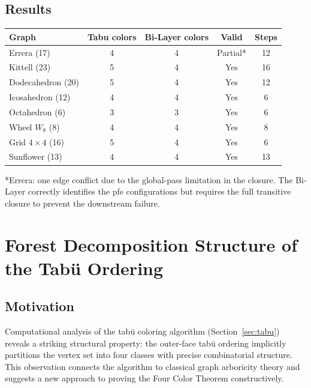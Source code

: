 \documentclass[12pt,letterpaper]{article}
\theoremstyle{plain}
\theoremstyle{definition}
\theoremstyle{remark}
\begin{document}
\subsection{Results}

\begin{center}
\begin{tabular}{lcccc}
\toprule
\textbf{Graph} & \textbf{Tabu colors} & \textbf{Bi-Layer colors} & \textbf{Valid} & \textbf{Steps} \\
\midrule
Errera (17)       & 4 & 4 & Partial* & 12 \\
Kittell (23)      & 5 & 4 & Yes      & 16 \\
Dodecahedron (20) & 5 & 4 & Yes      & 12 \\
Icosahedron (12)  & 4 & 4 & Yes      &  6 \\
Octahedron (6)    & 3 & 3 & Yes      &  6 \\
Wheel $W_8$ (8)   & 4 & 4 & Yes      &  8 \\
Grid $4\times4$ (16) & 5 & 4 & Yes   &  6 \\
Sunflower (13)    & 4 & 4 & Yes      & 13 \\
\bottomrule
\end{tabular}
\end{center}

\small{*Errera: one edge conflict due to the global-pass limitation in the closure.
The Bi-Layer correctly identifies the pfe configurations but requires the full
transitive closure to prevent the downstream failure.}

\section{Forest Decomposition Structure of the Tab\"{u} Ordering}
\label{sec:forest}

\subsection{Motivation}

Computational analysis of the tab\"{u} coloring algorithm
(Section~\ref{sec:tabu}) reveals a striking structural property: the
outer-face tab\"{u} ordering implicitly partitions the vertex set into four
classes with precise combinatorial structure. This observation connects the
algorithm to classical graph arboricity theory and suggests a new approach to
proving the Four Color Theorem constructively.
\end{document}
